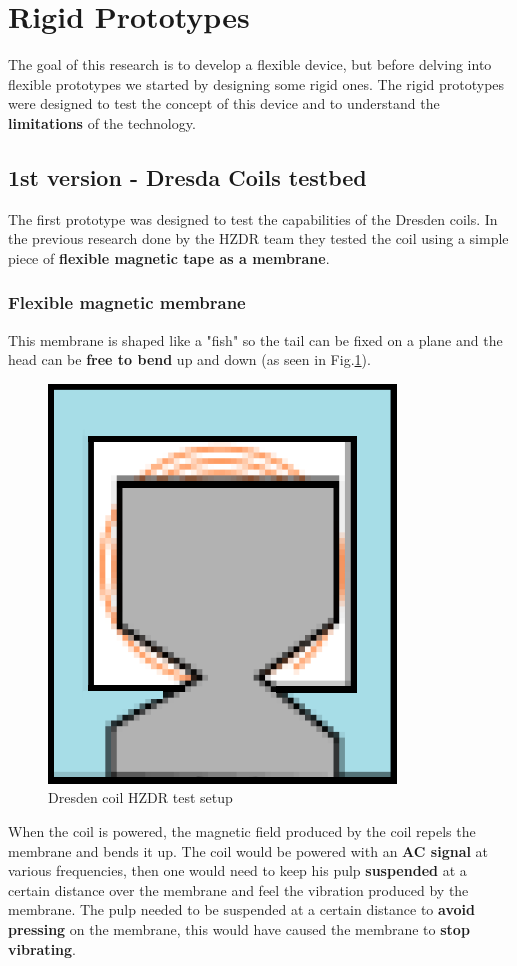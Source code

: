 \section{Rigid Prototypes}
The goal of this research is to develop a flexible device, but before delving into flexible prototypes we started by designing some rigid ones. The rigid prototypes were designed to test the concept of this device and to understand the \textbf{limitations} of the technology.

\subsection{1st version - Dresda Coils testbed}
The first prototype was designed to test the capabilities of the Dresden coils.
In the previous research done by the HZDR team \cite{HZDR} they tested the coil using a simple piece of \textbf{flexible magnetic tape as a membrane}.

\subsubsection{Flexible magnetic membrane}
\begin{samepage}
    This membrane is shaped like a "fish" so the tail can be fixed on a plane and the head can be \textbf{free to bend} up and down (as seen in Fig.\ref{fig: Dresden_test}).
    \nopagebreak

    \begin{figure}[H]
        \centering
        \includegraphics[width = 0.2\linewidth]{Chapters/Chapter5/Rigid_Prototypes/Figures/Dresden_test.png}
        \caption{Dresden coil HZDR test setup}
        \label{fig: Dresden_test}
    \end{figure}
\end{samepage}

When the coil is powered, the magnetic field produced by the coil repels the membrane and bends it up.
The coil would be powered with an \textbf{AC signal} at various frequencies, then one would need to keep his pulp \textbf{suspended} at a certain distance over the membrane and feel the vibration produced by the membrane.
The pulp needed to be suspended at a certain distance to \textbf{avoid pressing} on the membrane, this would have caused the membrane to \textbf{stop vibrating}.

